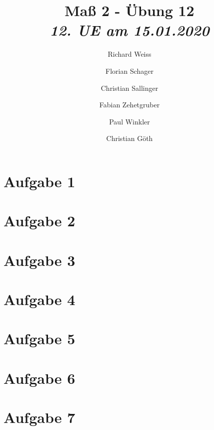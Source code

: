 \documentclass[]{article}
\title
{
  Maß 2 - Übung 12 \\
  \vspace{4pt}
  \normalsize
  \textit{12. UE am 15.01.2020}
}
\author
{
  Richard Weiss       \and
  Florian Schager     \and
  Christian Sallinger \and
  Fabian Zehetgruber  \and
  Paul Winkler        \and
  Christian Göth
}
\date{}
\begin{document}
    \begin{titlepage}
        \maketitle
    \end{titlepage}
    \section*{Aufgabe 1}
    
    \section*{Aufgabe 2}
    
    \section*{Aufgabe 3}
    
    \section*{Aufgabe 4}
    
    \section*{Aufgabe 5}
    
    \section*{Aufgabe 6}
    
    \section*{Aufgabe 7}
    
\end{document}
